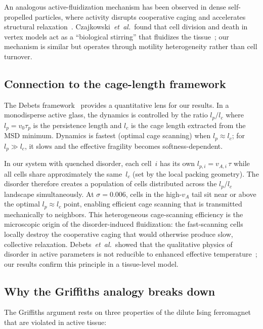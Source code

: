\documentclass[aps,pre,twocolumn,superscriptaddress,longbibliography,floatfix]{revtex4-2}
\begin{document}
An analogous active-fluidization mechanism has been observed in dense
self-propelled particles, where activity disrupts cooperative caging
and accelerates structural relaxation~\cite{mandal2020}.
Czajkowski~\textit{et~al.}\ found that cell division and death in
vertex models act as a ``biological stirring'' that fluidizes the
tissue~\cite{czajkowski2019}; our mechanism is similar but operates
through motility heterogeneity rather than cell turnover.

\subsection{Connection to the cage-length framework}

The Debets framework~\cite{debets2021,debets2022} provides a
quantitative lens for our results.  In a monodisperse active glass,
the dynamics is controlled by the ratio $l_p/l_c$ where
$l_p = v_0\tau_p$ is the persistence length and $l_c$ is the cage
length extracted from the MSD minimum.  Dynamics is fastest
(optimal cage scanning) when $l_p\!\approx\!l_c$; for $l_p\!\gg\!l_c$,
it slows and the effective fragility becomes softness-dependent.

In our system with quenched disorder, each cell~$i$ has its own
$l_{p,i} = v_{A,i}\,\tau$ while all cells share approximately the
same~$l_c$ (set by the local packing geometry).  The disorder therefore
creates a population of cells distributed across the $l_p/l_c$
landscape simultaneously.  At $\sigma\!=\!0.006$, cells in the high-$v_A$
tail sit near or above the optimal $l_p\!\approx\!l_c$ point, enabling
efficient cage scanning that is transmitted mechanically to neighbors.
This heterogeneous cage-scanning efficiency is the microscopic origin
of the disorder-induced fluidization: the fast-scanning cells locally
destroy the cooperative caging that would otherwise produce slow,
collective relaxation.  Debets~\textit{et~al.}\ showed that the qualitative
physics of disorder in active parameters is not reducible to enhanced
effective temperature~\cite{debets2023}; our results confirm this
principle in a tissue-level model.

\subsection{Why the Griffiths analogy breaks down}

The Griffiths argument rests on three properties of the dilute Ising
ferromagnet~\cite{griffiths1969,vojta2006} that are violated in active
tissue:
\end{document}
